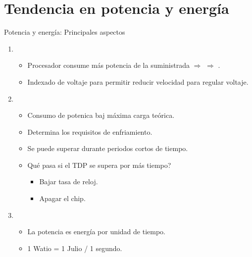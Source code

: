 \section{Tendencia en potencia y energía}

\begin{frame}[t]{Potencia y energía: Principales aspectos}
\begin{enumerate}
  \item {}
    \begin{itemize}
      \item Procesador consume más potencia de la suministrada $\Rightarrow$ 
            $\Rightarrow$ .
      \item Indexado de voltaje para permitir reducir velocidad para regular voltaje.
    \end{itemize}

  \item {}
    \begin{itemize}
      \item Consumo de potenica baj máxima carga teórica.
      \item Determina los requisitos de enfriamiento.
      \item Se puede superar durante periodos cortos de tiempo.
      \item Qué pasa si el TDP se supera por más tiempo?
        \begin{itemize}
          \item Bajar tasa de reloj.
          \item Apagar el chip.
        \end{itemize}
    \end{itemize}   

  \item {}
    \begin{itemize}
      \item La potencia es energía por unidad de tiempo.
      \item 1 Watio = 1 Julio / 1 segundo.
    \end{itemize}
\end{enumerate}
\end{frame}

